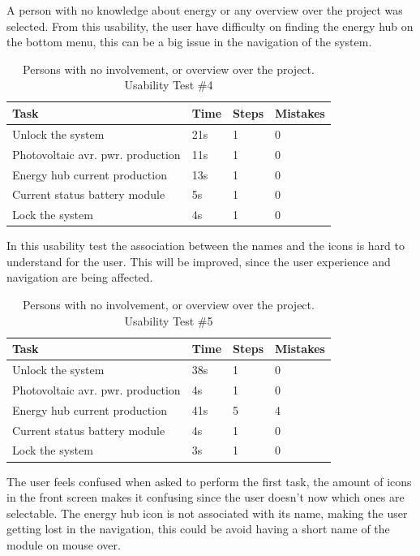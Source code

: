 A person with no knowledge about energy or any overview over the project was selected. From this usability, the user have difficulty on finding the energy hub on the bottom menu, this can be a big issue in the navigation of the system. 

\begin{table}[H]
\begin{tabular}{ | l | l | l | l |}
	\hline
	Task 					     &		Time 	& 	Steps 	& 	Mistakes 		\\ \hline
	Unlock the system 			     & 		21s		& 	1		& 	0			\\ \hline
	Photovoltaic avr. pwr. production  & 		11s		&	1		& 	0			\\ \hline
	Energy hub current production      & 		13s		& 	1		& 	0			\\ \hline
	Current status battery module 	     & 		5s		& 	1		& 	0			\\ \hline
	Lock the system 			     & 		4s		& 	1		& 	0			\\ \hline
\end{tabular}
\caption{Persons with no involvement, or overview over the project.  Usability Test \#4}
\end{table}

In this usability test the association between the names and the icons is hard to understand for the user. This will be improved, since the user experience and navigation are being affected.\\

\begin{table}[H]
\begin{tabular}{ | l | l | l | l |}
	\hline
	Task 					      & 	Time 	& 	Steps 	& 	Mistakes 		\\ \hline
	Unlock the system 			      & 	38s		& 	1		& 	0			\\ \hline
	Photovoltaic avr. pwr. production   &		4s	    	& 	1		& 	0			\\ \hline
	Energy hub current production 	      & 	41s		& 	5 		& 	4 			\\ \hline
	Current status battery module 	      & 	4s		& 	1		& 	0			\\ \hline
	Lock the system 			      & 	3s		& 	1		& 	0			\\ \hline
\end{tabular}
\caption{Persons with no involvement, or overview over the project. Usability Test \#5}
\end{table}

The user feels confused when asked to perform the first task, the amount of icons in the front screen makes it confusing since the user doesn't now which ones are selectable. The energy hub icon is not associated with its name, making the user getting lost in the navigation, this could be avoid having a short name of the module on mouse over.


